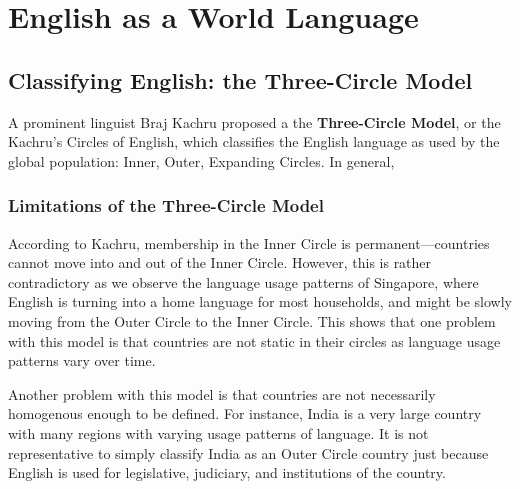 \documentclass[../main.tex]{subfiles}
\begin{document}
    \section{English as a World Language}
        \subsection{Classifying English: the Three-Circle Model}
        A prominent linguist Braj Kachru proposed a the \textbf{Three-Circle Model}, or the Kachru's Circles of English, which classifies the English language as used by the global population: Inner, Outer, Expanding Circles. In general, 


            \subsubsection{Limitations of the Three-Circle Model}
            According to Kachru, membership in the Inner Circle is permanent---countries cannot move into and out of the Inner Circle. However, this is rather contradictory as we observe the language usage patterns of Singapore, where English is turning into a home language for most households, and might be slowly moving from the Outer Circle to the Inner Circle. This shows that one problem with this model is that countries are not static in their circles as language usage patterns vary over time. \par
            Another problem with this model is that countries are not necessarily homogenous enough to be defined. For instance, India is a very large country with many regions with varying usage patterns of language. It is not representative to simply classify India as an Outer Circle country just because English is used for legislative, judiciary, and institutions of the country.
\end{document}
